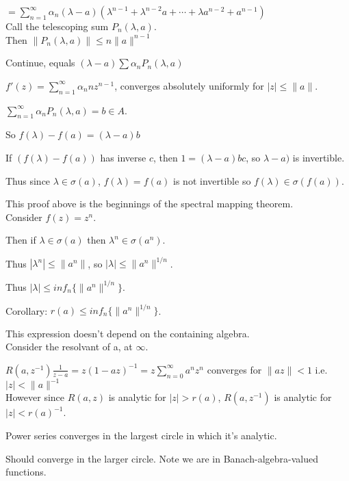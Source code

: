 \documentclass[12pt]{article}
\newcommand{\inv}{^{-1}}
\begin{document}
$ = \sum_{n = 1}^\infty \alpha_n(\lambda - a)(\lambda^{n - 1} + \lambda^{n - 2}a + \cdots + \lambda a^{n - 2} + a^{n - 1})$\\

Call the telescoping sum $P_n(\lambda, a)$.\\

Then $\|P_n(\lambda, a)\| \leq n\|a\|^{n - 1}$

Continue, equals $(\lambda - a) \sum \alpha_n P_n(\lambda, a)$

$f'(z) = \sum_{n = 1}^\infty \alpha_n n z^{n - 1}$, converges absolutely uniformly for $|z| \leq \|a\|$.

$\sum_{n = 1}^\infty \alpha_nP_n(\lambda, a) = b \in A$.

So $f(\lambda) - f(a) = (\lambda - a)b$

If $(f(\lambda) - f(a))$ has inverse $c$, then $1 = (\lambda - a)bc$, so $\lambda - a)$ is invertible.

Thus since $\lambda \in \sigma(a)$, $f(\lambda) = f(a)$ is not invertible so $f(\lambda) \in \sigma(f(a))$.

\noindent
This proof above is the beginnings of the spectral mapping theorem.\\

\noindent
Consider $f(z) = z^n$.

Then if $\lambda \in \sigma(a)$ then $\lambda^n \in \sigma(a^n)$.

Thus $|\lambda^n| \leq \|a^n\|$, so $|\lambda| \leq \|a^n\|^{1/n}$.

Thus $|\lambda| \leq inf_n\{\|a^n\|^{1/n}\}$.

\noindent
Corollary: $r(a) \leq inf_n\{\|a^n\|^{1/n}\}$.

This expression doesn't depend on the containing algebra.\\

\noindent
Consider the resolvant of a, at $\infty$.

$R(a, z^{-1}) \frac{1}{z - a} = z(1 - az)\inv = z\sum_{n = 0}^\infty a^nz^n$ converges for $\|az\| < 1$ i.e. $|z| < \|a\|^{-1}$\\

\noindent
However since $R(a, z)$ is analytic for $|z| > r(a)$, $R(a, z^{-1})$ is analytic for $|z| < r(a)\inv$.

Power series converges in the largest circle in which it's analytic.

Should converge in the larger circle.  Note we are in Banach-algebra-valued functions.
\end{document}

